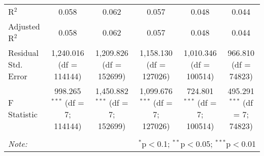 \begin{table}[!htbp]
\begin{tabular}{@{\extracolsep{3pt}}lccccc}
R$^{2}$ & 0.058 & 0.062 & 0.057 & 0.048 & 0.044 \\ 
Adjusted R$^{2}$ & 0.058 & 0.062 & 0.057 & 0.048 & 0.044 \\ 
Residual Std. Error & 1,240.016 (df = 114144) & 1,209.826 (df = 152699) & 1,158.130 (df = 127026) & 1,010.346 (df = 100514) & 966.810 (df = 74823) \\ 
F Statistic & 998.265$^{***}$ (df = 7; 114144) & 1,450.882$^{***}$ (df = 7; 152699) & 1,099.676$^{***}$ (df = 7; 127026) & 724.801$^{***}$ (df = 7; 100514) & 495.291$^{***}$ (df = 7; 74823) \\ 
\hline 
\hline \\[-1.8ex] 
\textit{Note:}  & \multicolumn{5}{r}{$^{*}$p$<$0.1; $^{**}$p$<$0.05; $^{***}$p$<$0.01} \\ 
\end{tabular} 
\end{table} 
